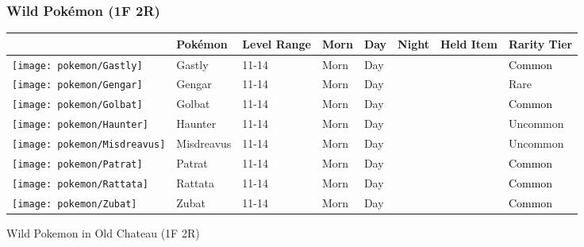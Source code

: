 \subsubsection{Wild Pokémon (1F 2R)}%
\label{ssubsec:WildPokmon(1F2R)}%
\begin{longtable}{||l l l l l l l l||}%
\hline%
\rowcolor{gray}%
&Pokémon&Level Range&Morn&Day&Night&Held Item&Rarity Tier\\%
\hline%
\endhead%
\hline%
\rowcolor{gray}%
\texttt{[image: pokemon/Gastly]}&Gastly&11{-}14&Morn&Day&&&\textcolor{black}{%
Common%
}\\%
\hline%
\rowcolor{gray}%
\texttt{[image: pokemon/Gengar]}&Gengar&11{-}14&Morn&Day&&&\textcolor{RedOrange}{%
Rare%
}\\%
\hline%
\rowcolor{gray}%
\texttt{[image: pokemon/Golbat]}&Golbat&11{-}14&Morn&Day&&&\textcolor{black}{%
Common%
}\\%
\hline%
\rowcolor{gray}%
\texttt{[image: pokemon/Haunter]}&Haunter&11{-}14&Morn&Day&&&\textcolor{OliveGreen}{%
Uncommon%
}\\%
\hline%
\rowcolor{gray}%
\texttt{[image: pokemon/Misdreavus]}&Misdreavus&11{-}14&Morn&Day&&&\textcolor{OliveGreen}{%
Uncommon%
}\\%
\hline%
\rowcolor{gray}%
\texttt{[image: pokemon/Patrat]}&Patrat&11{-}14&Morn&Day&&&\textcolor{black}{%
Common%
}\\%
\hline%
\rowcolor{gray}%
\texttt{[image: pokemon/Rattata]}&Rattata&11{-}14&Morn&Day&&&\textcolor{black}{%
Common%
}\\%
\hline%
\rowcolor{gray}%
\texttt{[image: pokemon/Zubat]}&Zubat&11{-}14&Morn&Day&&&\textcolor{black}{%
Common%
}\\%
\hline%
\end{longtable}%
\caption{Wild Pokemon in Old Chateau (1F 2R)}